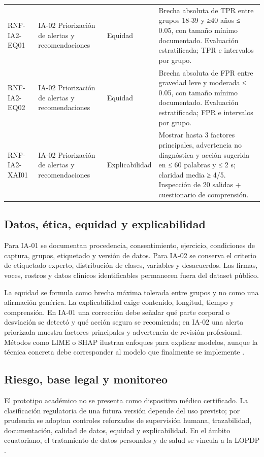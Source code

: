 \documentclass[12pt,a4paper]{article}
\begin{document}
\begin{longtable}{p{}p{}p{}p{}}
RNF-IA2-EQ01 & IA-02 Priorización de alertas y recomendaciones & Equidad & Brecha absoluta de TPR entre grupos 18-39 y ≥40 años ≤ 0.05, con tamaño mínimo documentado. Evaluación estratificada; TPR e intervalos por grupo. \\
RNF-IA2-EQ02 & IA-02 Priorización de alertas y recomendaciones & Equidad & Brecha absoluta de FPR entre gravedad leve y moderada ≤ 0.05, con tamaño mínimo documentado. Evaluación estratificada; FPR e intervalos por grupo. \\
RNF-IA2-XAI01 & IA-02 Priorización de alertas y recomendaciones & Explicabilidad & Mostrar hasta 3 factores principales, advertencia no diagnóstica y acción sugerida en ≤ 60 palabras y ≤ 2 s; claridad media ≥ 4/5. Inspección de 20 salidas + cuestionario de comprensión. \\
\bottomrule\end{longtable}\normalsize

\subsection{Datos, ética, equidad y explicabilidad}
Para IA-01 se documentan procedencia, consentimiento, ejercicio, condiciones de captura, grupos, etiquetado y versión de datos. Para IA-02 se conserva el criterio de etiquetado experto, distribución de clases, variables y desacuerdos. Las firmas, voces, rostros y datos clínicos identificables permanecen fuera del dataset público.

La equidad se formula como brecha máxima tolerada entre grupos y no como una afirmación genérica. La explicabilidad exige contenido, longitud, tiempo y comprensión. En IA-01 una corrección debe señalar qué parte corporal o desviación se detectó y qué acción segura se recomienda; en IA-02 una alerta priorizada muestra factores principales y advertencia de revisión profesional. Métodos como LIME o SHAP ilustran enfoques para explicar modelos, aunque la técnica concreta debe corresponder al modelo que finalmente se implemente \cite{ribeiro2016,lundberg2017}.

\subsection{Riesgo, base legal y monitoreo}
El prototipo académico no se presenta como dispositivo médico certificado. La clasificación regulatoria de una futura versión depende del uso previsto; por prudencia se adoptan controles reforzados de supervisión humana, trazabilidad, documentación, calidad de datos, equidad y explicabilidad. En el ámbito ecuatoriano, el tratamiento de datos personales y de salud se vincula a la LOPDP \cite{lopdp2021}.
\end{document}
